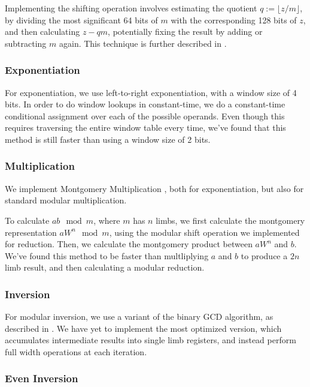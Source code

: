 \documentclass[11pt, a4paper]{article} %
\begin{document}
{Implementing the shifting operation involves estimating
the quotient $q := \lfloor z / m \rfloor$, by dividing
the most significant 64 bits of $m$ with
the corresponding 128 bits of $z$,
and then
calculating $z - q m$, potentially fixing the result
by adding or subtracting $m$ again.
This technique is further described in \cite{pornin_bearssl_2020-1}.


\subsubsection{Exponentiation}

For exponentiation, we use left-to-right exponentiation,
with a window size of 4 bits. In order to do window lookups
in constant-time, we do a constant-time conditional assignment
over each of the possible operands. Even though this requires traversing
the entire window table every time, we've found that this method
is still faster than using a window size of 2 bits.

\subsubsection{Multiplication}

We implement Montgomery Multiplication
\cite{kaya_koc_analyzing_1996-1, pornin_bearssl_2020-1}, both
for exponentiation, but also for standard modular multiplication.

To calculate $ab \mod m$,
where $m$ has $n$ limbs, we first calculate the montgomery representation
$aW^n \mod m$, using the modular shift operation we implemented for
reduction. Then, we calculate the montgomery product
between $aW^n$ and $b$. We've found this method to be faster
than multliplying $a$ and $b$ to produce a $2n$ limb result, and then
calculating a modular reduction.

\subsubsection{Inversion}

For modular inversion, we use a variant of
the binary GCD algorithm, as described in \cite{pornin_optimized_2020}.
We have yet to implement the most optimized version, which accumulates
intermediate results into single limb registers, and instead
perform full width operations at each iteration.

\subsubsection{Even Inversion}

}
\end{document}
